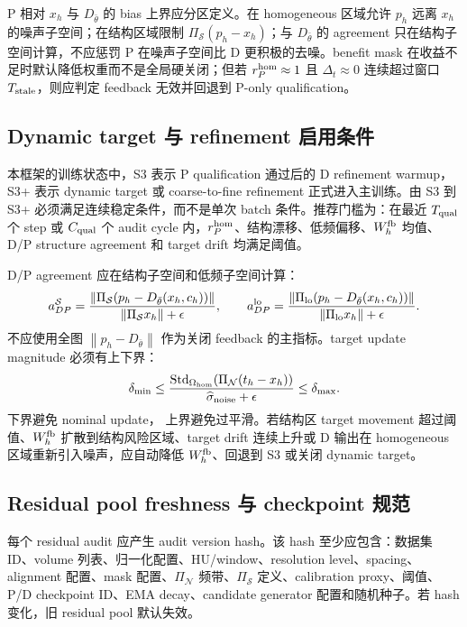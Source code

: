 \documentclass[11pt,a4paper,UTF8,fontset=fandol]{ctexart}
\theoremstyle{definition}
\DeclareMathOperator{\Std}{Std}
\newcommand{\norm}[1]{\left\lVert#1\right\rVert}
\begin{document}
P 相对 $x_h$ 与 $D_{\bar\theta}$ 的 bias 上界应分区定义。在 homogeneous 区域允许 $p_h$ 远离 $x_h$ 的噪声子空间；在结构区域限制 $\Pi_{\mathcal S}(p_h-x_h)$；与 $D_{\bar\theta}$ 的 agreement 只在结构子空间计算，不应惩罚 P 在噪声子空间比 D 更积极的去噪。benefit mask 在收益不足时默认降低权重而不是全局硬关闭；但若 $r_P^{\rm hom}\approx1$ 且 $\Delta_t\approx0$ 连续超过窗口 $T_{\rm stale}$，则应判定 feedback 无效并回退到 P-only qualification。

\subsection{Dynamic target 与 refinement 启用条件}
\label{subsec:dynamic-target-trigger-protocol}

本框架的训练状态中，S3 表示 P qualification 通过后的 D refinement warmup，S3+ 表示 dynamic target 或 coarse-to-fine refinement 正式进入主训练。由 S3 到 S3+ 必须满足连续稳定条件，而不是单次 batch 条件。推荐门槛为：在最近 $T_{\rm qual}$ 个 step 或 $C_{\rm qual}$ 个 audit cycle 内，$r_P^{\rm hom}$、结构漂移、低频偏移、$W_h^{\rm fb}$ 均值、D/P structure agreement 和 target drift 均满足阈值。

D/P agreement 应在结构子空间和低频子空间计算：
\begin{equation}
    a_{DP}^{\mathcal S}=
    \frac{\norm{\Pi_{\mathcal S}(p_h-D_{\bar\theta}(x_h,c_h))}}
    {\norm{\Pi_{\mathcal S}x_h}+\epsilon},
    \qquad
    a_{DP}^{\rm lo}=
    \frac{\norm{\Pi_{\rm lo}(p_h-D_{\bar\theta}(x_h,c_h))}}
    {\norm{\Pi_{\rm lo}x_h}+\epsilon} .
\end{equation}
不应使用全图 $\norm{p_h-D_{\bar\theta}}$ 作为关闭 feedback 的主指标。target update magnitude 必须有上下界：
\begin{equation}
    \delta_{\min}
    \le
    \frac{\Std_{\Omega_{\rm hom}}(\Pi_{\mathcal N}(t_h-x_h))}
    {\widehat\sigma_{\rm noise}+\epsilon}
    \le
    \delta_{\max} .
\end{equation}
下界避免 nominal update， 上界避免过平滑。若结构区 target movement 超过阈值、$W_h^{\rm fb}$ 扩散到结构风险区域、target drift 连续上升或 D 输出在 homogeneous 区域重新引入噪声，应自动降低 $W_h^{\rm fb}$、回退到 S3 或关闭 dynamic target。

\subsection{Residual pool freshness 与 checkpoint 规范}
\label{subsec:residual-freshness-checkpoint}

每个 residual audit 应产生 audit version hash。该 hash 至少应包含：数据集 ID、volume 列表、归一化配置、HU/window、resolution level、spacing、alignment 配置、mask 配置、$\Pi_{\mathcal N}$ 频带、$\Pi_{\mathcal S}$ 定义、calibration proxy、阈值、P/D checkpoint ID、EMA decay、candidate generator 配置和随机种子。若 hash 变化，旧 residual pool 默认失效。
\end{document}
